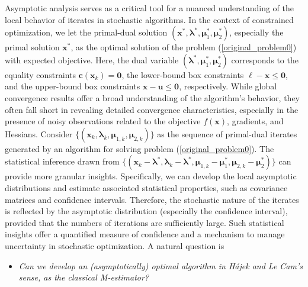 \documentclass[aos]{imsart}
\numberwithin{equation}{section}
\theoremstyle{plain}
\begin{document}
Asymptotic analysis serves as a critical tool for a nuanced understanding of the local behavior of iterates in stochastic algorithms. In the context of constrained optimization, we let the primal-dual solution $(\bm{x}^{*}, \bm{\lambda}^{*}, \bm{\mu}_1^{*}, \bm{\mu}_2^{*})$, especially the primal solution $\bm{x}^{*}$, as the optimal solution of the problem (\ref{original_problem0}) with expected objective. Here, the dual variable $(\bm{\lambda}^{*}, \bm{\mu}_1^{*}, \bm{\mu}_2^{*})$ corresponds to the equality constraints $\bm{c}(\bm{x}_k) = \bm{0}$, the lower-bound box constraints $\bm{\ell} - \bm{x} \leq \bm{0}$, and the upper-bound box constraints  $\bm{x} - \bm{u} \leq \bm{0}$, respectively. 
While global convergence results offer a broad understanding of the algorithm's behavior, they often fall short in revealing detailed convergence characteristics, especially in the presence of noisy observations related to the objective \(f(\bm{x})\), gradients, and Hessians.
Consider $\{(\bm{x}_k, \bm{\lambda}_{k}, \bm{\mu}_{1,k}, \bm{\mu}_{2,k})\}$ as the sequence of primal-dual iterates generated by an algorithm for solving problem (\ref{original_problem0}). The statistical inference drawn from $\{(\bm{x}_k - \bm{\lambda}^{*}, \bm{\lambda}_{k} - \bm{\lambda}^{*}, \bm{\mu}_{1,k} - \bm{\mu}_1^{*}, \bm{\mu}_{2,k} - \bm{\mu}_2^{*})\}$ 
can provide more granular insights.
Specifically, we can develop the local asymptotic distributions and estimate associated statistical properties, such as covariance matrices and confidence intervals. 
Therefore, the stochastic nature of the iterates is reflected by the asymptotic distribution (especially the confidence interval), provided that the numbers of iterations are sufficiently large. 
Such statistical insights offer a quantified measure of confidence and a mechanism to manage uncertainty in stochastic optimization. A natural question is 
\begin{itemize}
\item \textit{Can we develop an (asymptotically) optimal algorithm in H\'ajek and Le Cam's sense, as the classical M-estimator?}

\end{itemize}
\end{document}

